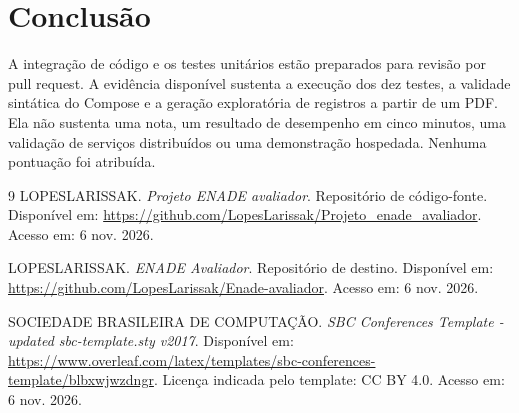 \documentclass[12pt]{article}
\begin{document}
\section{Conclusão}

A integração de código e os testes unitários estão preparados para revisão por pull request. A evidência disponível sustenta a execução dos dez testes, a validade sintática do Compose e a geração exploratória de registros a partir de um PDF. Ela não sustenta uma nota, um resultado de desempenho em cinco minutos, uma validação de serviços distribuídos ou uma demonstração hospedada. Nenhuma pontuação foi atribuída.

\begin{thebibliography}{9}
LOPESLARISSAK. \textit{Projeto ENADE avaliador}. Repositório de código-fonte. Disponível em: \url{https://github.com/LopesLarissak/Projeto_enade_avaliador}. Acesso em: 6 nov. 2026.

LOPESLARISSAK. \textit{ENADE Avaliador}. Repositório de destino. Disponível em: \url{https://github.com/LopesLarissak/Enade-avaliador}. Acesso em: 6 nov. 2026.

SOCIEDADE BRASILEIRA DE COMPUTAÇÃO. \textit{SBC Conferences Template - updated sbc-template.sty v2017}. Disponível em: \url{https://www.overleaf.com/latex/templates/sbc-conferences-template/blbxwjwzdngr}. Licença indicada pelo template: CC BY 4.0. Acesso em: 6 nov. 2026.
\end{thebibliography}
\end{document}
